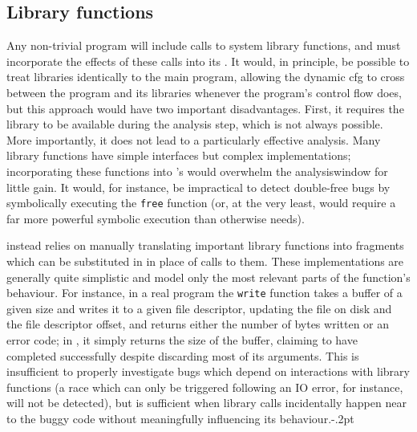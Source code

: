 \subsection{Library functions}
\label{sect:derive:library_functions}

Any non-trivial program will include calls to system library
functions, and {\technique} must incorporate the effects of these
calls into its {\StateMachines}.  It would, in principle, be possible
to treat libraries identically to the main program, allowing the
\gls{dynamic cfg} to cross between the program and its libraries
whenever the program's control flow does, but this approach would have
two important disadvantages.  First, it requires the library to be
available during the analysis step, which is not always possible.
More importantly, it does not lead to a particularly effective
analysis.  Many library functions have simple interfaces but complex
implementations; incorporating these functions into {\technique}'s
{\StateMachines} would overwhelm the \gls{analysiswindow} for little
gain.  It would, for instance, be impractical to detect double-free
bugs by symbolically executing the \texttt{free} function (or, at the
very least, would require a far more powerful symbolic execution than
{\technique} otherwise needs).

{\Technique} instead relies on manually translating important library
functions into {\StateMachine} fragments which can be substituted in
in place of calls to them.  These implementations are generally quite
simplistic and model only the most relevant parts of the function's
behaviour.  For instance, in a real program the \texttt{write}
function takes a buffer of a given size and writes it to a given file
descriptor, updating the file on disk and the file descriptor offset,
and returns either the number of bytes written or an error code; in
{\atechnique} {\StateMachine}, it simply returns the size of the
buffer, claiming to have completed successfully despite discarding
most of its arguments.  This is insufficient to properly investigate
bugs which depend on interactions with library functions (a race which
can only be triggered following an IO error, for instance, will not be
detected), but is sufficient when library calls incidentally happen
near to the buggy code without meaningfully influencing its
behaviour.\kern-.2pt

